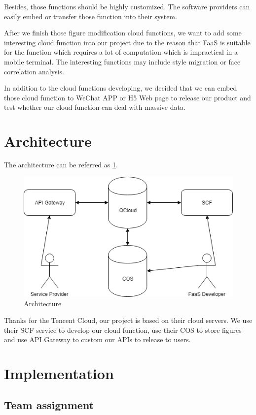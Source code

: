 \documentclass[a4paper,12pt]{article}
\begin{document}
Besides, those functions should be highly customized. The software providers can easily embed or transfer those function into their system. 

After we finish those figure modification cloud functions, we want to add some interesting cloud function into our project due to the reason that FaaS is suitable for the function which requires a lot of computation which is impractical in a mobile terminal. The interesting functions may include style migration or face correlation analysis. 

In addition to the cloud functions developing, we decided that we can embed those cloud function to WeChat APP or H5 Web page to release our product and test whether our cloud function can deal with massive data.

\section{Architecture}

The architecture can be referred as \ref{diagram}.

\begin{figure}[H]
\label{diagram}
\includegraphics[scale=0.8]{figures/Diagram.png}
\caption{Architecture}
\end{figure}

Thanks for the Tencent Cloud, our project is based on their cloud servers. We use their SCF service to develop our cloud function, use their COS to store figures and use API Gateway to custom our APIs to release to users. 

\section{Implementation}

\subsection{Team assignment}
\end{document}
